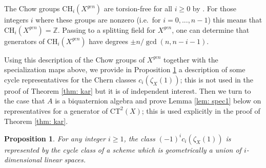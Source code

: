 \documentclass[12pt]{amsart}
\newtheorem{prop}[thm]{Proposition}
\theoremstyle{definition}
\newcommand{\CH}{\mathrm{CH}}
\newcommand{\CT}{\mathrm{CT}}
\begin{document}
The Chow groups $\CH_i(X^{gen})$ are torsion-free for all $i\geq 0$ by \cite[Proposition 3.2]{MR3590349}. For those integers $i$ where these groups are nonzero (i.e.\ for $i=0,...,n-1$) this means that $\CH_i(X^{gen})=\mathbb{Z}$. Passing to a splitting field for $X^{gen}$, one can determine that generators of $\CH_i(X^{gen})$ have degrees $\pm n/\gcd(n,n-i-1)$.

Using this description of the Chow groups of $X^{gen}$ together with the specialization maps above, we provide in Proposition \ref{prop: reps} a description of some cycle representatives for the Chern classes $c_i(\zeta_X(1))$; this is not used in the proof of Theorem \ref{thm: kar} but it is of independent interest. Then we turn to the case that $A$ is a biquaternion algebra and prove Lemma \ref{lem: spec1} below on representatives for a generator of $\CT^2(X)$; this is used explicitly in the proof of Theorem \ref{thm: kar}.

\begin{prop}\label{prop: reps}
For any integer $i\geq 1$, the class $(-1)^ic_i(\zeta_X(1))$ is represented by the cycle class of a scheme which is geometrically a union of $i$-dimensional linear spaces.
\end{prop}
\end{document}
